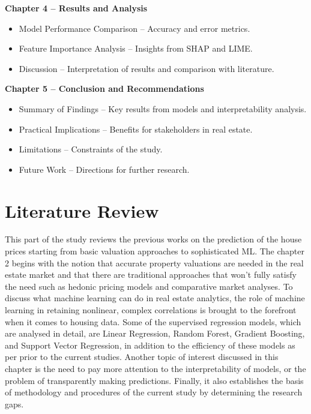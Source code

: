 \documentclass[12pt, a4paper, oneside]{book}
\begin{document}
\textbf{Chapter 4 -- Results and Analysis}
\begin{itemize}
\item Model Performance Comparison -- Accuracy and error metrics.
\item Feature Importance Analysis -- Insights from SHAP and LIME.
\item Discussion -- Interpretation of results and comparison with literature.
\end{itemize}

\textbf{Chapter 5 -- Conclusion and Recommendations}
\begin{itemize}
\item Summary of Findings -- Key results from models and interpretability analysis.
\item Practical Implications -- Benefits for stakeholders in real estate.
\item Limitations -- Constraints of the study.
\item Future Work -- Directions for further research.
\end{itemize}

\setcounter{chapter}{1}

\chapter{Literature Review}\label{ch:2}
This part of the study reviews the previous works on the prediction of the house prices starting from basic valuation approaches to sophisticated ML. The chapter 2 begins with the notion that accurate property valuations are needed in the real estate market and that there are traditional approaches that won’t fully satisfy the need such as hedonic pricing models and comparative market analyses. To discuss what machine learning can do in real estate analytics, the role of machine learning in retaining nonlinear, complex correlations is brought to the forefront when it comes to housing data. Some of the supervised regression models, which are analysed in detail, are Linear Regression, Random Forest, Gradient Boosting, and Support Vector Regression, in addition to the efficiency of these models as per prior to the current studies. Another topic of interest discussed in this chapter is the need to pay more attention to the interpretability of models, or the problem of transparently making predictions. Finally, it also establishes the basis of methodology and procedures of the current study by determining the research gaps.
\end{document}
